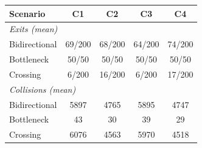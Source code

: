 \begin{tabular}{lcccc}
\hline
\textbf{Scenario} & \textbf{C1} & \textbf{C2} & \textbf{C3} & \textbf{C4} \\
\hline
\multicolumn{5}{l}{\textit{Exits (mean)}} \\
Bidirectional & 69/200 & 68/200 & 64/200 & 74/200 \\
Bottleneck & 50/50 & 50/50 & 50/50 & 50/50 \\
Crossing & 6/200 & 16/200 & 6/200 & 17/200 \\
\hline
\multicolumn{5}{l}{\textit{Collisions (mean)}} \\
Bidirectional & 5897 & 4765 & 5895 & 4747 \\
Bottleneck & 43 & 30 & 39 & 29 \\
Crossing & 6076 & 4563 & 5970 & 4518 \\
\hline
\end{tabular}
